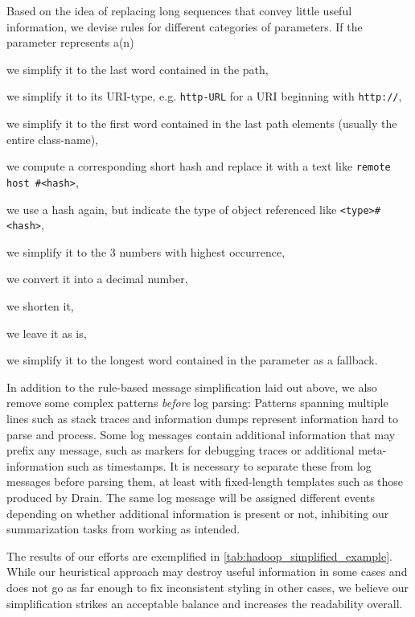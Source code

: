 Based on the idea of replacing long sequences that convey little useful information,
we devise rules for different categories of parameters.
If the parameter represents a(n)
\begin{description}[nosep, itemsep=1ex, labelwidth=.25\textwidth, leftmargin=\labelwidth+\labelsep, align=parright]
\item[filesystem path] we simplify it to the last word contained in the path,
\item[URI] we simplify it to its URI-type, e.g. \verb+http-URL+ for a URI beginning with \verb+http://+,
\item[Java object path] we simplify it to the first word contained in the last path elements (usually the entire class-name),
\item[IP- or mad-address] we compute a corresponding short hash and replace it with a text like \verb+remote host #<hash>+,
\item[known identifier] we use a hash again, but indicate the type of object referenced like \verb+<type>#<hash>+,
\item[long list of numbers] we simplify it to the 3 numbers with highest occurrence,
\item[hexadecimal number] we convert it into a decimal number,
\item[long sequence of hex.~characters] we shorten it,
\item[number] we leave it as is,
\item[otherwise] we simplify it to the longest word contained in the parameter as a fallback.
\end{description}

In addition to the rule-based message simplification laid out above,
we also remove some complex patterns \emph{before} log parsing:
Patterns spanning multiple lines such as stack traces and information dumps represent information hard to parse and process.
Some log messages contain additional information that may prefix any message,
such as markers for debugging traces or additional meta-information such as timestamps.
It is necessary to separate these from log messages before parsing them,
at least with fixed-length templates such as those produced by Drain.
The same log message will be assigned different events depending on whether additional information is present or not,
inhibiting our summarization tasks from working as intended.

The results of our efforts are exemplified in \autoref{tab:hadoop_simplified_example}.
While our heuristical approach may destroy useful information in some cases
and does not go as far enough to fix inconsistent styling in other cases,
we believe our simplification strikes an acceptable balance and increases the readability overall.


